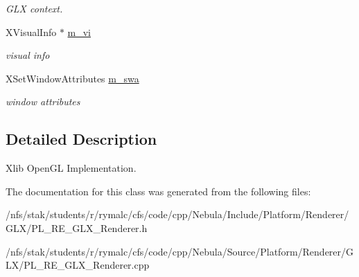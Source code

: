 \begin{DoxyCompactItemize}
\begin{DoxyCompactList}\small\item\em GLX context. \item\end{DoxyCompactList}\item 
\hypertarget{classPlatform_1_1Renderer_1_1RendererGLX_af62a4091a49886c0fb5c55bd092e82f4}{
XVisualInfo $\ast$ \hyperlink{classPlatform_1_1Renderer_1_1RendererGLX_af62a4091a49886c0fb5c55bd092e82f4}{m\_\-vi}}
\label{classPlatform_1_1Renderer_1_1RendererGLX_af62a4091a49886c0fb5c55bd092e82f4}

\begin{DoxyCompactList}\small\item\em visual info \item\end{DoxyCompactList}\item 
\hypertarget{classPlatform_1_1Renderer_1_1RendererGLX_ae11e8b20d4571f7b70b4ad56dac90858}{
XSetWindowAttributes \hyperlink{classPlatform_1_1Renderer_1_1RendererGLX_ae11e8b20d4571f7b70b4ad56dac90858}{m\_\-swa}}
\label{classPlatform_1_1Renderer_1_1RendererGLX_ae11e8b20d4571f7b70b4ad56dac90858}

\begin{DoxyCompactList}\small\item\em window attributes \item\end{DoxyCompactList}\end{DoxyCompactItemize}


\subsection{Detailed Description}
Xlib OpenGL Implementation. 

The documentation for this class was generated from the following files:\begin{DoxyCompactItemize}
\item 
/nfs/stak/students/r/rymalc/cfs/code/cpp/Nebula/Include/Platform/Renderer/GLX/PL\_\-RE\_\-GLX\_\-Renderer.h\item 
/nfs/stak/students/r/rymalc/cfs/code/cpp/Nebula/Source/Platform/Renderer/GLX/PL\_\-RE\_\-GLX\_\-Renderer.cpp\end{DoxyCompactItemize}
